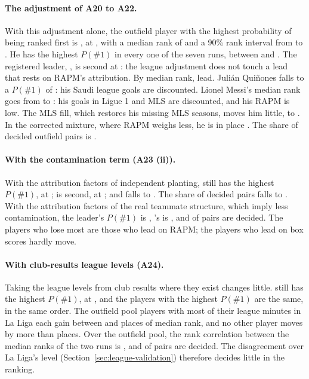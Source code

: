 \documentclass[11pt,a4paper]{article}
\begin{document}
\paragraph{The adjustment of A20 to A22.}
With this adjustment alone, the outfield player with the highest probability
of being ranked first is \LeagueTopName{}, at \LeagueTopPFirst{}, with a median
rank of \LeagueTopMedianRank{} and a 90\% rank interval from \LeagueTopRankLo{}
to \LeagueTopRankHi{}. He has the highest $P(\#1)$ in every one of the seven
runs, between \LeagueVariantsPFirstLo{} and \LeagueVariantsPFirstHi{}. The
registered leader, \TopPlayerName{}, is second at \LeagueSecondPFirst{}: the
league adjustment does not touch a lead that rests on RAPM's attribution. By
median rank, \LeagueMedianTopThree{} lead. Julián Quiñones falls to a $P(\#1)$
of \LeagueQuinonesPFirst{}: his Saudi league goals are discounted. Lionel
Messi's median rank goes from \MessiMedianRank{} to \LeagueMessiMedianRank{}:
his goals in Ligue 1 and MLS are discounted, and his RAPM is low. The MLS
fill, which restores his missing MLS seasons, moves him little, to
\LeagueMlsMessiMedianRank{}. In the corrected mixture, where RAPM weighs
less, he is in place \CorrectedMessiPlace{}. The share of decided outfield
pairs is \LeagueSharePairsDecided{}.

\paragraph{With the contamination term (A23 (ii)).}
With the attribution factors of independent planting,
\LeagueLeakIndepTopName{} still has the highest $P(\#1)$, at
\LeagueLeakIndepTopPFirst{}; \LeagueLeakIndepSecondName{} is second, at
\LeagueLeakIndepSecondPFirst{}; and \TopPlayerName{} falls to
\LeagueLeakIndepLeaderPFirst{}. The share of decided pairs falls to
\LeagueLeakIndepSharePairsDecided{}. With the attribution factors of the real
teammate structure, which imply less contamination, the leader's $P(\#1)$ is
\LeagueLeakAssortTopPFirst{}, \TopPlayerName{}'s is
\LeagueLeakAssortLeaderPFirst{}, and \LeagueLeakAssortSharePairsDecided{} of
pairs are decided. The players who lose most are those who lead on RAPM; the
players who lead on box scores hardly move.

\paragraph{With club-results league levels (A24).}
Taking the league levels from club results where they exist changes little.
\LeagueTopName{} still has the highest $P(\#1)$, at \LeagueClubTopPFirst{},
and the \LeagueClubTopSameOrder{} players with the highest $P(\#1)$ are the
same, in the same order. The \LeagueClubNLaLiga{} outfield pool players with
most of their league minutes in La Liga each gain between
\LeagueClubLaLigaGainLo{} and \LeagueClubLaLigaGainHi{} places of median rank,
and no other player moves by more than \LeagueClubOthersMaxMove{} places. Over
the outfield pool, the rank correlation between the median ranks of the two
runs is \LeagueClubSpearmanMedianRank{}, and \LeagueClubSharePairsDecided{} of
pairs are decided. The disagreement over La Liga's level
(Section~\ref{sec:league-validation}) therefore decides little in the ranking.
\end{document}
